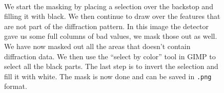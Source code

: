 \documentclass[11pt,a4paper]{article}
\newcommand{\program}[1]{\textsc{#1}}
\newcommand{\com}[1]{\texttt{#1}}
\begin{document}
\begin{figure}
\mbox{\hspace{-0.1\textwidth}
  }
  \caption{ We start the masking by placing a selection over the backstop and filling it with black.  We then continue to draw over the features that are not part of the diffraction pattern.  In this image the detector gave us some full columns of bad values, we mask those out as well.  We have now masked out all the areas that doesn't contain diffraction data.  We then use the ``select by color'' tool in \program{GIMP} to select all the black parts.  The last step is to invert the selection and fill it with white. The mask is now done and can be saved in \com{.png} format.}
  \label{fig:draw_mask}
\end{figure}
\end{document}

